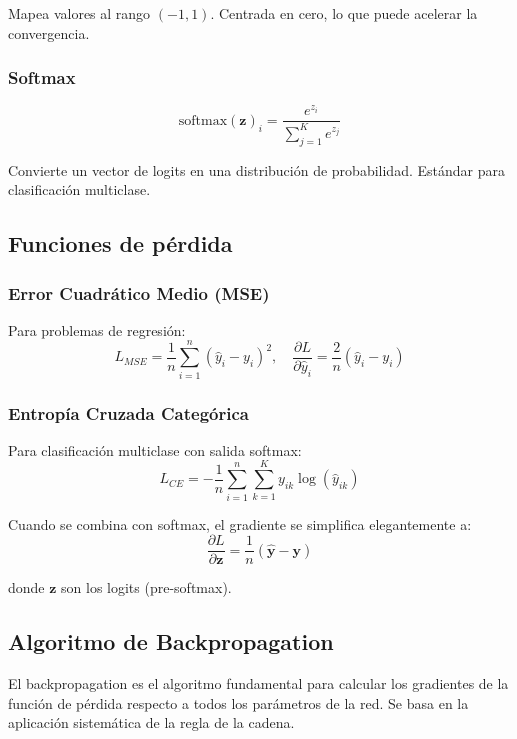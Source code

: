 \documentclass[a4paper,11pt]{article}
\begin{document}
Mapea valores al rango $(-1, 1)$. Centrada en cero, lo que puede acelerar la convergencia.

\subsubsection{Softmax}
\begin{equation}
\text{softmax}(\mathbf{z})_i = \frac{e^{z_i}}{\sum_{j=1}^{K} e^{z_j}}
\end{equation}

Convierte un vector de logits en una distribución de probabilidad. Estándar para clasificación multiclase.

\subsection{Funciones de pérdida}

\subsubsection{Error Cuadrático Medio (MSE)}
Para problemas de regresión:
\begin{equation}
L_{MSE} = \frac{1}{n} \sum_{i=1}^{n} (\hat{y}_i - y_i)^2, \quad \frac{\partial L}{\partial \hat{y}_i} = \frac{2}{n}(\hat{y}_i - y_i)
\end{equation}

\subsubsection{Entropía Cruzada Categórica}
Para clasificación multiclase con salida softmax:
\begin{equation}
L_{CE} = -\frac{1}{n} \sum_{i=1}^{n} \sum_{k=1}^{K} y_{ik} \log(\hat{y}_{ik})
\end{equation}

Cuando se combina con softmax, el gradiente se simplifica elegantemente a:
\begin{equation}
\frac{\partial L}{\partial \mathbf{z}} = \frac{1}{n}(\hat{\mathbf{y}} - \mathbf{y})
\end{equation}

donde $\mathbf{z}$ son los logits (pre-softmax).

\subsection{Algoritmo de Backpropagation}

El backpropagation es el algoritmo fundamental para calcular los gradientes de la función de pérdida respecto a todos los parámetros de la red. Se basa en la aplicación sistemática de la regla de la cadena.
\end{document}
